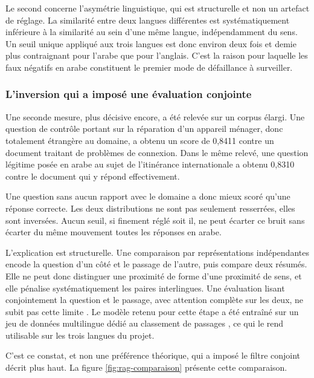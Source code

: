 Le second concerne l'asymétrie linguistique, qui est structurelle et non un artefact de réglage. La similarité entre deux langues différentes est systématiquement inférieure à la similarité au sein d'une même langue, indépendamment du sens. Un seuil unique appliqué aux trois langues est donc environ deux fois et demie plus contraignant pour l'arabe que pour l'anglais. C'est la raison pour laquelle les faux négatifs en arabe constituent le premier mode de défaillance à surveiller.

\subsubsection{L'inversion qui a imposé une évaluation conjointe}

Une seconde mesure, plus décisive encore, a été relevée sur un corpus élargi. Une question de contrôle portant sur la réparation d'un appareil ménager, donc totalement étrangère au domaine, a obtenu un score de 0,8411 contre un document traitant de problèmes de connexion. Dans le même relevé, une question légitime posée en arabe au sujet de l'itinérance internationale a obtenu 0,8310 contre le document qui y répond effectivement.

Une question sans aucun rapport avec le domaine a donc mieux scoré qu'une réponse correcte. Les deux distributions ne sont pas seulement resserrées, elles sont inversées. Aucun seuil, si finement réglé soit il, ne peut écarter ce bruit sans écarter du même mouvement toutes les réponses en arabe.

L'explication est structurelle. Une comparaison par représentations indépendantes encode la question d'un côté et le passage de l'autre, puis compare deux résumés. Elle ne peut donc distinguer une proximité de forme d'une proximité de sens, et elle pénalise systématiquement les paires interlingues. Une évaluation lisant conjointement la question et le passage, avec attention complète sur les deux, ne subit pas cette limite \cite{nogueira}. Le modèle retenu pour cette étape a été entraîné sur un jeu de données multilingue dédié au classement de passages \cite{mmarco}, ce qui le rend utilisable sur les trois langues du projet.

C'est ce constat, et non une préférence théorique, qui a imposé le filtre conjoint décrit plus haut. La figure \ref{fig:rag-comparaison} présente cette comparaison.


